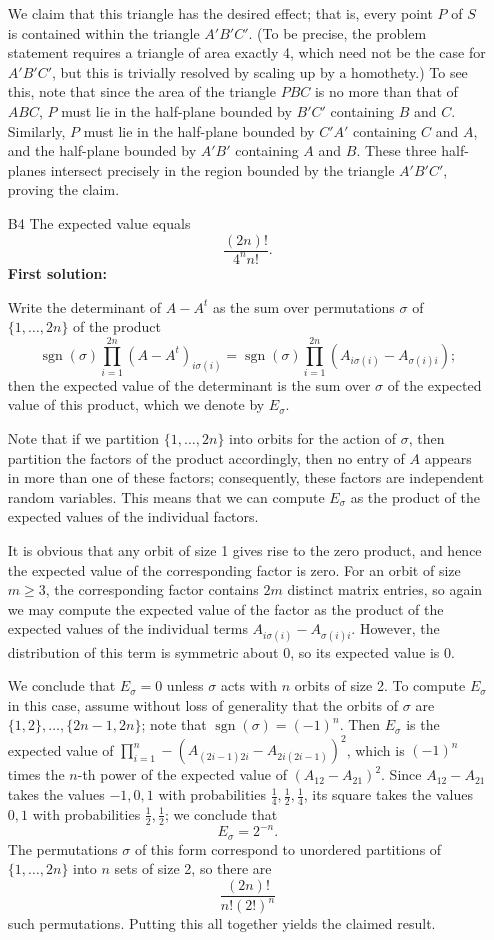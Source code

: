 \documentclass[amssymb,twocolumn,pra,10pt,aps]{revtex4-1}
\DeclareMathOperator{\sgn}{sgn}
\begin{document}
\begin{itemize}
We claim that this triangle has the desired effect; that is, every point $P$ of $S$ is contained within the triangle $A'B'C'$. 
(To be precise, the problem statement requires a triangle of area exactly 4, which need not be the case for $A'B'C'$, but this is trivially resolved by scaling up by a homothety.)
To see this, note that since the area of the triangle $PBC$ is no more than that of $ABC$, $P$ must lie in the half-plane bounded by $B'C'$ containing $B$ and $C$. Similarly, $P$ must lie in the half-plane bounded by $C'A'$ containing
$C$ and $A$, and the half-plane bounded by $A'B'$ containing $A$ and $B$. These three half-planes intersect precisely in the region bounded by the triangle $A'B'C'$, proving the claim.

\item[B4]
The expected value equals
\[
\frac{(2n)!}{4^n n!}.
\]
\noindent
\textbf{First solution:}

Write the determinant of $A-A^t$ as the sum over permutations $\sigma$ of $\{1,\dots,2n\}$ of the product
\[
\sgn(\sigma)
\prod_{i=1}^{2n}
(A-A^t)_{i \sigma(i)} 
=
\sgn(\sigma) \prod_{i=1}^{2n} (A_{i \sigma(i)} - A_{\sigma(i) i});
\]
then the expected value of the determinant is the sum over $\sigma$ of the expected value of this product, which we denote by $E_\sigma$. 

Note that if we partition $\{1,\dots,2n\}$ into orbits for the action of $\sigma$, then partition the factors of the product accordingly, then no entry of $A$ appears in more than one of these factors; consequently, these factors are independent random variables. This means that we can compute $E_\sigma$ as the product of the expected values of the individual factors.

It is obvious that any orbit of size 1 gives rise to the zero product, and hence the expected value of the corresponding factor is zero. For an orbit of size $m \geq 3$, the corresponding factor contains $2m$ distinct matrix entries, so again we may compute the expected value of the factor as the product of the expected values of the individual terms $A_{i \sigma(i)} - A_{\sigma(i) i}$. However, the distribution of this term is symmetric about 0, so its expected value is 0.

We conclude that $E_\sigma = 0$ unless $\sigma$ acts with $n$ orbits of size 2. To compute $E_\sigma$ in this case, assume without loss of generality that the orbits of $\sigma$ are
$\{1,2\}, \dots, \{2n-1,2n\}$; note that $\sgn(\sigma) = (-1)^n$. Then $E_\sigma$ is the expected value of
$\prod_{i=1}^n -(A_{(2i-1)2i} - A_{2i(2i-1)})^2$, which is $(-1)^n$ times the $n$-th power
of the expected value of $(A_{12} - A_{21})^2$. Since $A_{12} - A_{21}$ takes the values $-1, 0, 1$ with probabilities $\frac{1}{4}, \frac{1}{2}, \frac{1}{4}$, its square takes the values
$0,1$ with probabilities $\frac{1}{2}, \frac{1}{2}$; we conclude that
\[
E_\sigma = 2^{-n}.
\]
The permutations $\sigma$ of this form correspond to unordered partitions of $\{1,\dots,2n\}$ into $n$ sets of size 2, so there are
\[
\frac{(2n)!}{n!(2!)^n}
\]
such permutations. Putting this all together yields the claimed result.


\end{itemize}
\end{document}
